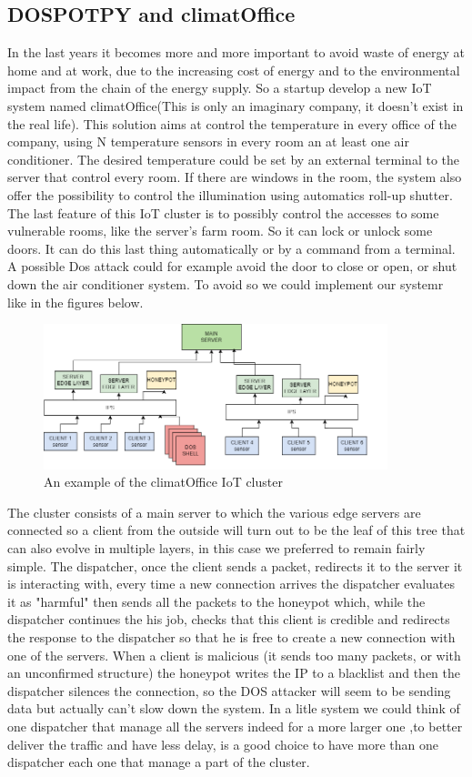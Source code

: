\subsection{DOSPOTPY and climatOffice}
In the last years it becomes more and more important to avoid waste of energy at home and at work, due to the increasing cost of energy and to the environmental impact from the chain of the energy supply. So a startup develop a new IoT system named climatOffice(This is only an imaginary company, it doesn't exist in the real life). This solution aims at control the temperature in every office of the company, using N temperature sensors in every room an at least one air conditioner. The desired temperature could be set by an external terminal to the server that control every room. If there are windows in the room, the system also offer the possibility to control the illumination using automatics roll-up shutter. The last feature of this IoT cluster is to possibly control the accesses to some vulnerable rooms, like the server's farm room. So it can lock or unlock some doors. It can do this last thing automatically or by a command from a terminal. A possible Dos attack could for example avoid the door to close or open, or shut down the air conditioner system. To avoid so we could implement our systemr like in the figures below.
\begin{figure}[h!]
  \centering
  \includegraphics[width = 10cm]{images/IOTlever2IPS.png}
  \caption{An example of the climatOffice IoT cluster}
  \label{fig:TCPDos}
\end{figure}
\FloatBarrier
\noindent
The cluster consists of a main server to which the various edge servers are connected so a client  from the outside will turn out to be the leaf of this tree that can also evolve in multiple layers, in this case we preferred to remain fairly simple. The dispatcher, once the client sends a packet, redirects it to the server it is interacting with, every time a new connection arrives the dispatcher evaluates it as "harmful" then sends all the packets to the honeypot which, while the dispatcher continues the his job, checks that this client is credible and redirects the response to the dispatcher so that he is free to create a new connection with one of the servers. When a client is malicious (it sends too many packets, or with an unconfirmed structure) the honeypot writes the IP to a blacklist and then the dispatcher silences the connection, so the DOS attacker will seem to be sending data but actually can't slow down the system. In a litle system we could think of one dispatcher that manage all the servers indeed for a more larger one ,to better deliver the traffic and have less delay, is a good choice to have more than one dispatcher each one that manage a part of the cluster.\\
